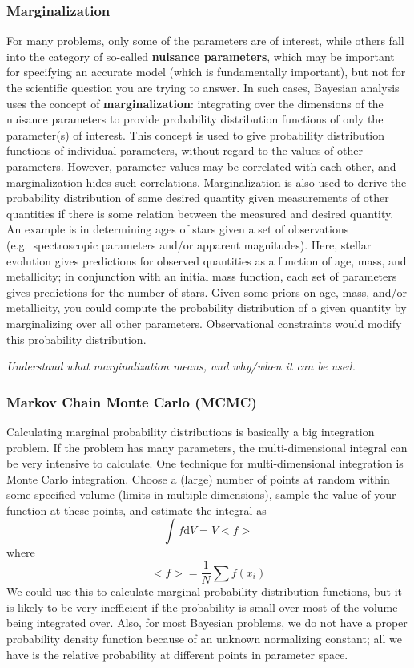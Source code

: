 \documentclass{article}
\newcommand{\test}[1]{%
    \begin{center}
        \colorbox{hl}{\parbox{0.9\textwidth}{\emph{\centering #1}}}
    \end{center}}
\begin{document}
\subsubsection{Marginalization} For many problems, only some of the parameters
are of interest, while others fall into the category of so-called
\textbf{nuisance parameters}, which may be important for specifying an accurate
model (which is fundamentally important), but not for the scientific question
you are trying to answer. In such cases, Bayesian analysis uses the concept of
\textbf{marginalization}: integrating over the dimensions of the nuisance
parameters to provide probability distribution functions of only the
parameter(s) of interest. This concept is used to give probability distribution
functions of individual parameters, without regard to the values of other
parameters.  However, parameter values may be correlated with each other, and
marginalization hides such correlations.  Marginalization is also used to
derive the probability distribution of some desired quantity given measurements
of other quantities if there is some relation between the measured and desired
quantity. An example is in determining ages of stars given a set of
observations (e.g.\ spectroscopic parameters and/or apparent magnitudes). Here,
stellar evolution gives predictions for observed quantities as a function of
age, mass, and metallicity; in conjunction with an initial mass function, each
set of parameters gives predictions for the number of stars. Given some priors
on age, mass, and/or metallicity, you could compute the probability
distribution of a given quantity by marginalizing over all other parameters.
Observational constraints would modify this probability distribution.

\test{Understand what marginalization means, and why/when it can be used.}

\subsubsection{Markov Chain Monte Carlo (MCMC)}\label{mcmc} Calculating
marginal probability distributions is basically a big integration problem. If
the problem has many parameters, the multi-dimensional integral can be very
intensive to calculate.  One technique for multi-dimensional integration is
Monte Carlo integration. Choose a (large) number of points at random within
some specified volume (limits in multiple dimensions), sample the value of your
function at these points, and estimate the integral as
$${ \int\!f\mathrm{d}V = V<f> }$$ where
$${ <f> = \frac{1}{N}\sum{f(x_i)} }$$
We could use this to calculate marginal probability distribution functions, but
it is likely to be very inefficient if the probability is small over most of
the volume being integrated over. Also, for most Bayesian problems, we do not
have a proper probability density function because of an unknown normalizing
constant; all we have is the relative probability at different points in
parameter space.
\end{document}
